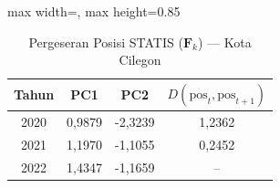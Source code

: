 \begin{table}[H]
\centering
\caption{Pergeseran Posisi STATIS ($\mathbf{F}_k$) --- Kota Cilegon} \label{tab:sample1jarak_statis_skor_kota_cilegon}
\begin{adjustbox}{max width=\textwidth, max height=0.85\textheight}
\begin{tabular}{|c|c|c|c|}
\hline
\textbf{Tahun} & \textbf{PC1} & \textbf{PC2} & \textbf{$D(\text{pos}_t, \text{pos}_{t+1})$} \\
\hline
2020 & 0,9879 & -2,3239 & 1,2362 \\
2021 & 1,1970 & -1,1055 & 0,2452 \\
2022 & 1,4347 & -1,1659 & -- \\
\hline
\end{tabular}
\end{adjustbox}
\end{table}